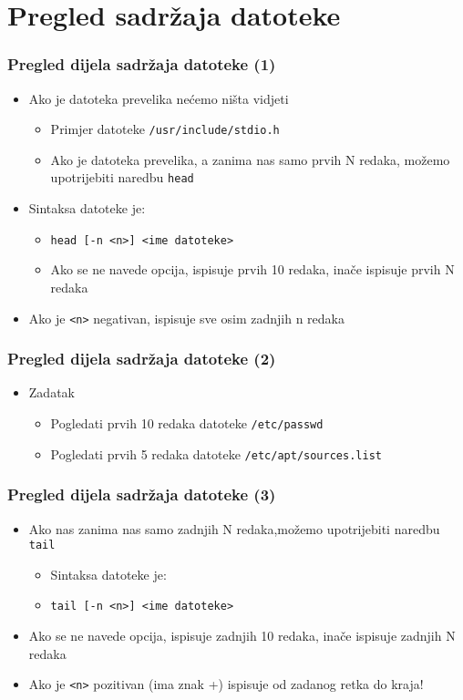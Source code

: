 \documentclass{beamer}
\newcommand{\shell}[1]{\texttt{#1}}
\begin{document}
\section{Pregled sadržaja datoteke}
\begin{frame}[t]
\frametitle{Pregled dijela sadržaja datoteke (1)}
\begin{itemize}
  \item Ako je datoteka prevelika nećemo ništa vidjeti
  \begin{itemize}
    \item Primjer datoteke \shell{/usr/include/stdio.h}
    \item Ako je datoteka prevelika, a zanima nas samo prvih N redaka, 
          možemo upotrijebiti naredbu \shell{head}
  \end{itemize}
  \item Sintaksa datoteke je:
  \begin{itemize}
    \item[] \shell{head [-n <n>] <ime datoteke>}
    \item Ako se ne navede opcija, ispisuje prvih 10 redaka, inače ispisuje          prvih N redaka
  \end{itemize}
  \item Ako je \shell{<n>} negativan, ispisuje sve osim zadnjih n redaka
\end{itemize}
\end{frame}
  
\begin{frame}[t]
\frametitle{Pregled dijela sadržaja datoteke (2)}
\begin{itemize}
  \item Zadatak
  \begin{itemize}
    \item Pogledati prvih 10 redaka datoteke \shell{/etc/passwd}
    \item Pogledati prvih 5 redaka datoteke \shell{/etc/apt/sources.list}
  \end{itemize}
\end{itemize}
\end{frame}

\begin{frame}[t]
\frametitle{Pregled dijela sadržaja datoteke (3)}
\begin{itemize}
  \item Ako nas zanima nas samo zadnjih N redaka,možemo upotrijebiti 
        naredbu \shell{tail}
  \begin{itemize}
    \item Sintaksa datoteke je:
    \item[] \shell{tail [-n <n>] <ime datoteke>}
  \end{itemize}
  \item Ako se ne navede opcija, ispisuje zadnjih 10 redaka, inače ispisuje
        zadnjih N redaka
  \item Ako je \shell{<n>} pozitivan (ima znak +) ispisuje od zadanog 
        retka do kraja!
\end{itemize}
\end{frame}
\end{document}
